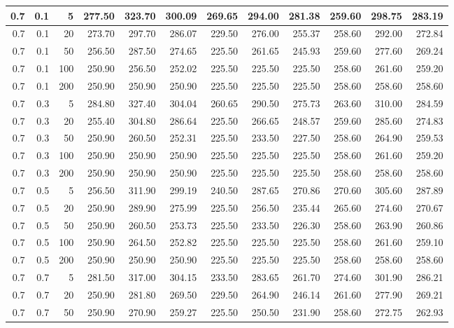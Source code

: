 \begin{longtable}{|r|r|r|r|r|r|r|r|r|r|r|r|}
		\hline
		0.7 & 0.1 & 5 & 277.50 & 323.70 & 300.09 & 269.65 & 294.00 & 281.38 & 259.60 & 298.75 & 283.19\\
		\hline
		0.7 & 0.1 & 20 & 273.70 & 297.70 & 286.07 & 229.50 & 276.00 & 255.37 & 258.60 & 292.00 & 272.84\\
		\hline
		0.7 & 0.1 & 50 & 256.50 & 287.50 & 274.65 & 225.50 & 261.65 & 245.93 & 259.60 & 277.60 & 269.24\\
		\hline
		0.7 & 0.1 & 100 & 250.90 & 256.50 & 252.02 & 225.50 & 225.50 & 225.50 & 258.60 & 261.60 & 259.20\\
		\hline
		0.7 & 0.1 & 200 & 250.90 & 250.90 & 250.90 & 225.50 & 225.50 & 225.50 & 258.60 & 258.60 & 258.60\\
		\hline
		0.7 & 0.3 & 5 & 284.80 & 327.40 & 304.04 & 260.65 & 290.50 & 275.73 & 263.60 & 310.00 & 284.59\\
		\hline
		0.7 & 0.3 & 20 & 255.40 & 304.80 & 286.64 & 225.50 & 266.65 & 248.57 & 259.60 & 285.60 & 274.83\\
		\hline
		0.7 & 0.3 & 50 & 250.90 & 260.50 & 252.31 & 225.50 & 233.50 & 227.50 & 258.60 & 264.90 & 259.53\\
		\hline
		0.7 & 0.3 & 100 & 250.90 & 250.90 & 250.90 & 225.50 & 225.50 & 225.50 & 258.60 & 261.60 & 259.20\\
		\hline
		0.7 & 0.3 & 200 & 250.90 & 250.90 & 250.90 & 225.50 & 225.50 & 225.50 & 258.60 & 258.60 & 258.60\\
		\hline
		0.7 & 0.5 & 5 & 256.50 & 311.90 & 299.19 & 240.50 & 287.65 & 270.86 & 270.60 & 305.60 & 287.89\\
		\hline
		0.7 & 0.5 & 20 & 250.90 & 289.90 & 275.99 & 225.50 & 256.50 & 235.44 & 265.60 & 274.60 & 270.67\\
		\hline
		0.7 & 0.5 & 50 & 250.90 & 260.50 & 253.73 & 225.50 & 233.50 & 226.30 & 258.60 & 263.90 & 260.86\\
		\hline
		0.7 & 0.5 & 100 & 250.90 & 264.50 & 252.82 & 225.50 & 225.50 & 225.50 & 258.60 & 261.60 & 259.10\\
		\hline
		0.7 & 0.5 & 200 & 250.90 & 250.90 & 250.90 & 225.50 & 225.50 & 225.50 & 258.60 & 258.60 & 258.60\\
		\hline
		0.7 & 0.7 & 5 & 281.50 & 317.00 & 304.15 & 233.50 & 283.65 & 261.70 & 274.60 & 301.90 & 286.21\\
		\hline
		0.7 & 0.7 & 20 & 250.90 & 281.80 & 269.50 & 229.50 & 264.90 & 246.14 & 261.60 & 277.90 & 269.21\\
		\hline
		0.7 & 0.7 & 50 & 250.90 & 270.90 & 259.27 & 225.50 & 250.50 & 231.90 & 258.60 & 272.75 & 262.93\\

\end{longtable}
